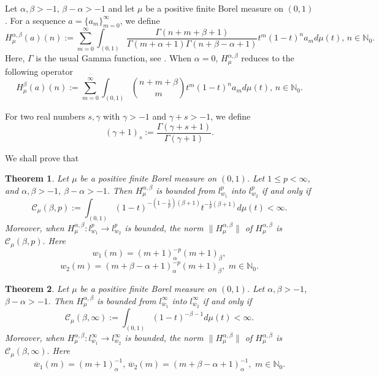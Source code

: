 \documentclass[10pt]{amsart}
\newtheorem{theorem}{Theorem}[section]
\theoremstyle{definition}
\theoremstyle{question}
\numberwithin{equation}{section}
\begin{document}
Let $\alpha, \beta>-1$, $\beta-\alpha>-1$ and let $\mu$ be a positive finite Borel measure on $(0,1)$. For a sequence $a=\{a_m\}_{m=0}^{\infty}$, we define
$$H_{\mu}^{\alpha, \beta}(a)(n):=\sum\limits_{m=0}^{\infty}\int_{(0,1)}\frac{\Gamma(n+m+\beta+1)}{\Gamma(m+\alpha+1)\Gamma(n+\beta-\alpha+1)}t^m (1-t)^{n}a_md\mu(t), \,  n \in \mathbb{N}_0.$$
Here, $\Gamma$ is the usual Gamma function, see \cite{AAR}. When $\alpha=0$, $H_{\mu}^{\alpha, \beta}$ reduces to the following operator
$$H_{\mu}^{\beta}(a)(n):=\sum\limits_{m=0}^{\infty}\int_{(0,1)}\binom{n+m+\beta}{m}t^m (1-t)^{n}a_md\mu(t),\,  n \in \mathbb{N}_0.$$

For two real numbers $s, \gamma$ with $\gamma>-1$ and $\gamma+s>-1$, we define  
$$(\gamma+1)_s:=\frac{\Gamma(\gamma+s+1)}{\Gamma(\gamma+1)}.$$

We shall prove that
\begin{theorem}\label{main}
Let $\mu$ be a positive finite Borel measure on $(0,1)$. Let $1\leq p<\infty$, and $\alpha, \beta>-1$, $\beta-\alpha>-1$. Then $H_{\mu}^{\alpha,\beta}$ is bounded from $l_{w_1}^{p}$ into $l_{w_2}^{p}$ if and only if 
$$\mathcal{C}_{\mu}(\beta, p):=\int_{(0,1)} (1-t)^{-(1-\frac{1}{p})(\beta+1)} t^{-\frac{1}{p}(\beta+1)}d\mu(t)<\infty.$$
Moreover, when $H_{\mu}^{\alpha, \beta}:l_{w_1}^{p}\rightarrow l_{w_2}^{p}$ is bounded, the norm $\|H_{\mu}^{\alpha,\beta}\|$ of $H_{\mu}^{\alpha, \beta}$ is $\mathcal{C}_{\mu}(\beta, p).$
Here $$w_1(m)=(m+1)_{\alpha}^{-p} (m+1)_{\beta},$$
 $$w_2(m)=(m+\beta-\alpha+1)_{\alpha}^{-p} (m+1)_{\beta}, \,\, m\in \mathbb{N}_0. $$
\end{theorem}

\begin{theorem}\label{main-2}
Let $\mu$ be a positive finite Borel measure on $(0,1)$. Let $\alpha, \beta>-1$, $\beta-\alpha>-1$. Then $H_{\mu}^{\alpha,\beta}$ is bounded from $l_{\overline{w}_1}^{\infty}$ into $l_{\overline{w}_2}^{\infty}$ if and only if 
$$\mathcal{C}_{\mu}(\beta, \infty):=\int_{(0,1)} (1-t)^{-\beta-1}d\mu(t)<\infty.$$
Moreover, when $H_{\mu}^{\alpha, \beta}: l_{\overline{w}_1}^{\infty}\rightarrow l_{\overline{w}_2}^{\infty}$ is bounded, the norm $\|H_{\mu}^{\alpha,\beta}\|$ of $H_{\mu}^{\alpha, \beta}$ is $\mathcal{C}_{\mu}(\beta,\infty).$
Here $$\overline{w}_1(m)=(m+1)_{\alpha}^{-1}, \, \overline{w}_2(m)=(m+\beta-\alpha+1)_{\alpha}^{-1}, \,\, m\in \mathbb{N}_0.$$
\end{theorem}
\end{document}
